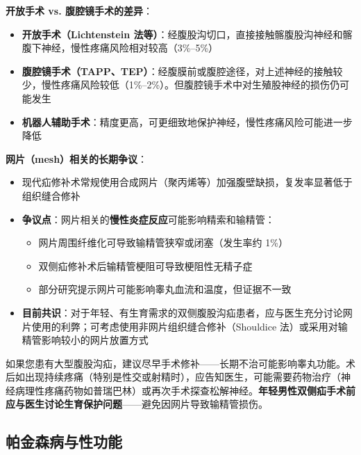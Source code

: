 \vspace{0.5em}
\noindent\textbf{开放手术 vs. 腹腔镜手术的差异}：

\begin{itemize}[leftmargin=2cm]
	\item \textbf{开放手术（Lichtenstein 法等）}：经腹股沟切口，直接接触髂腹股沟神经和髂腹下神经，慢性疼痛风险相对较高（3\%--5\%）
	\item \textbf{腹腔镜手术（TAPP、TEP）}：经腹膜前或腹腔途径，对上述神经的接触较少，慢性疼痛风险较低（1\%--2\%）。但腹腔镜手术中对生殖股神经的损伤仍可能发生
	\item \textbf{机器人辅助手术}：精度更高，可更细致地保护神经，慢性疼痛风险可能进一步降低
\end{itemize}

\vspace{0.5em}
\noindent\textbf{网片（mesh）相关的长期争议}：

\begin{itemize}[leftmargin=2cm]
	\item 现代疝修补术常规使用合成网片（聚丙烯等）加强腹壁缺损，复发率显著低于组织缝合修补
	\item \textbf{争议点}：网片相关的\textbf{慢性炎症反应}可能影响精索和输精管：
	\begin{itemize}
		\item 网片周围纤维化可导致输精管狭窄或闭塞（发生率约 1\%）
		\item 双侧疝修补术后输精管梗阻可导致梗阻性无精子症
		\item 部分研究提示网片可能影响睾丸血流和温度，但证据不一致
	\end{itemize}
	\item \textbf{目前共识}：对于年轻、有生育需求的双侧腹股沟疝患者，应与医生充分讨论网片使用的利弊；可考虑使用非网片组织缝合修补（Shouldice 法）或采用对输精管影响较小的网片放置方式
\end{itemize}

\begin{tcolorbox}[colback=pink!5!white,colframe=red!50!black,title=贴心小叮咛]
如果您患有大型腹股沟疝，建议尽早手术修补——长期不治可能影响睾丸功能。术后如出现持续疼痛（特别是性交或射精时），应告知医生，可能需要药物治疗（神经病理性疼痛药物如普瑞巴林）或再次手术探查松解神经。\textbf{年轻男性双侧疝手术前应与医生讨论生育保护问题}——避免因网片导致输精管损伤。
\end{tcolorbox}

\subsection{帕金森病与性功能}
\label{subsec:parkinson_sex}

